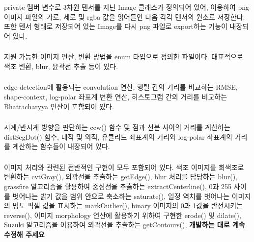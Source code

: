 \documentclass[conference]{IEEEtran}
\begin{document}
 private 멤버 변수로  3차원 텐서를 지닌 Image 클래스가 정의되어 있어,  이용하여 png 이미지 파일의 가로, 세로 및 rgba 값을 읽어들인 다음 각각 텐서의 원소로 저장한다.
또한 \Eigen 텐서 형태로 저장되어 있는 Image를 다시 png 파일로 export하는 기능이 내장되어 있다.

\subsubsection{\egMethods}

 지원 가능한 이미지 연산, 변환 방법을 enum 타입으로 정의한 파일이다.
대표적으로 색조 변환, blur, 윤곽선 추출 등이 있다.

\subsubsection{\egMath}

 edge-detection에 활용되는 convolution 연산, 행렬 간의 거리를 비교하는 RMSE, shape-context, log-polar 좌표계 변환 연산, 히스토그램 간의 거리를 비교하는 Bhattacharyya 연산이 포함되어 있다.

\subsubsection{\egGeometry}

 시계/반시계 방향을 판단하는 ccw() 함수 및 점과 선분 사이의 거리를 계산하는 distSegDot() 함수, 내적 및 외적, 유클리드 좌표계의 거리와 log-polar 좌표계의 거리를 계산하는 함수들이 내장되어 있다. 

\subsubsection{\egProcessing}

 이미지 처리와 관련된 전반적인 구현이 모두 포함되어 있다.
색조 이미지를 회색조로 변환하는 cvtGray(),
외곽선을 추출하는 getEdge(),
blur 처리를 담당하는 blur(),
grassfire 알고리즘을 활용하여 중심선을 추출하는 extractCenterline(),
0과 255 사이를 벗어나는 밝기 값을 범위 안으로 축소하는 saturate(),
일정 역치를 벗어나는 이미지의 명도 픽셀 값을 표시하는 markOutlier(),
binary 이미지의 0과 1값을 반전시키는 reverse(),
이미지 morphology 연산에 활용하기 위하여 구현한 erode() 및 dilate(),
Suzuki 알고리즘을 이용하여 외곽선을 추출하는 getContours(),
\textbf{개발하는 대로 계속 수정해 주세요~}

\subsubsection{\egTrace}
\end{document}
